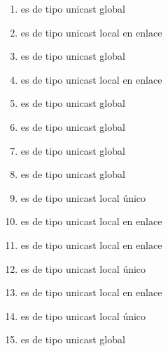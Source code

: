 \documentclass[letterpaper,10pt,spanish]{sphinxmanual}
\begin{document}
\begin{enumerate}
\item {} 
 es de tipo unicast global

\item {} 
 es de tipo unicast local en enlace

\item {} 
 es de tipo unicast global

\item {} 
 es de tipo unicast local en enlace

\item {} 
 es de tipo unicast global

\item {} 
 es de tipo unicast global

\item {} 
 es de tipo unicast global

\item {} 
 es de tipo unicast global

\item {} 
 es de tipo unicast local único

\item {} 
 es de tipo unicast local en enlace

\item {} 
 es de tipo unicast local en enlace

\item {} 
 es de tipo unicast local único

\item {} 
 es de tipo unicast local en enlace

\item {} 
 es de tipo unicast local único

\item {} 
 es de tipo unicast global


\end{enumerate}
\end{document}
